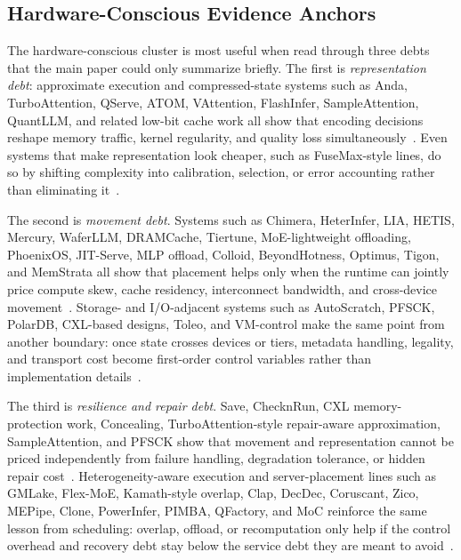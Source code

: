 \subsection{Hardware-Conscious Evidence Anchors}

The hardware-conscious cluster is most useful when read through three debts that the main paper could only summarize briefly. The first is \emph{representation debt}: approximate execution and compressed-state systems such as Anda, TurboAttention, QServe, ATOM, VAttention, FlashInfer, SampleAttention, QuantLLM, and related low-bit cache work all show that encoding decisions reshape memory traffic, kernel regularity, and quality loss simultaneously~\cite{fang2025anda,kang2025turboattention,lin2025qserve,zhao2024atom,prabhu2025vattention,ye2025flashinfer,zhu2024sampleattention,xia2024quantllm,dong2024qhitter}. Even systems that make representation look cheaper, such as FuseMax-style lines, do so by shifting complexity into calibration, selection, or error accounting rather than eliminating it~\cite{nayak2024fusemax,kwon2020fvm,jha2025hycache}.

The second is \emph{movement debt}. Systems such as Chimera, HeterInfer, LIA, HETIS, Mercury, WaferLLM, DRAMCache, Tiertune, MoE-lightweight offloading, PhoenixOS, JIT-Serve, MLP offload, Colloid, BeyondHotness, Optimus, Tigon, and MemStrata all show that placement helps only when the runtime can jointly price compute skew, cache residency, interconnect bandwidth, and cross-device movement~\cite{huang2025chimera,chen2025heteroinfer,kim2025lia,mo2025hetis,mercury2025rms,he2025waferllm,hong2024dramcache,lee2025tiertune,cao2025moelightning,wei2025phoenixos,zhang2026jitserve,maurya2025mlpoffload,vuppalapati2024colloid,liu2025beyondhotness,feng2025optimus,huang2025tigon,zhong2024memstrata}. Storage- and I/O-adjacent systems such as AutoScratch, PFSCK, PolarDB, CXL-based designs, Toleo, and VM-control make the same point from another boundary: once state crosses devices or tiers, metadata handling, legality, and transport cost become first-order control variables rather than implementation details~\cite{fu2024autoscratch,domingo2021pfsck,cao2020polardb,ji2025cxl,dong2024toleo,zheng2024vmcu,tabatabai2024fbmm}.

The third is \emph{resilience and repair debt}. Save, ChecknRun, CXL memory-protection work, Concealing, TurboAttention-style repair-aware approximation, SampleAttention, and PFSCK show that movement and representation cannot be priced independently from failure handling, degradation tolerance, or hidden repair cost~\cite{zheng2025save,eisenman2022checknrun,zhao2025equilibria,jin2024concealing,kang2025turboattention,zhu2024sampleattention,domingo2021pfsck}. Heterogeneity-aware execution and server-placement lines such as GMLake, Flex-MoE, Kamath-style overlap, Clap, DecDec, Coruscant, Zico, MEPipe, Clone, PowerInfer, PIMBA, QFactory, and MoC reinforce the same lesson from scheduling: overlap, offload, or recomputation only help if the control overhead and recovery debt stay below the service debt they are meant to avoid~\cite{guo2024gmlake,cao2025moelightning,kamath2025podattention,park2025clap,park2025decdec,joo2025coruscant,zico21,sun2025mepipe,tian2025clone,song2024powerinfer,kim2025pimba,zhang2025qfactory,cai2025moc}.


